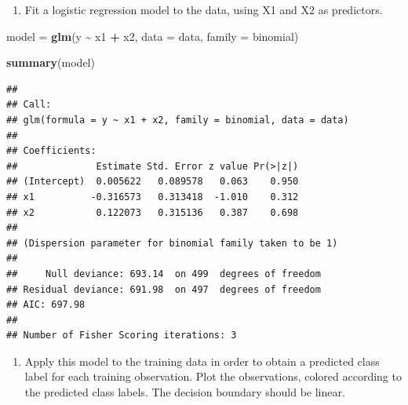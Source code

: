 \documentclass[
]{article}
\newenvironment{Shaded}{\begin{snugshade}}{\end{snugshade}}
\newcommand{\AttributeTok}[1]{\textcolor[rgb]{0.13,0.29,0.53}{#1}}
\newcommand{\FunctionTok}[1]{\textcolor[rgb]{0.13,0.29,0.53}{\textbf{#1}}}
\newcommand{\NormalTok}[1]{#1}
\newcommand{\OtherTok}[1]{\textcolor[rgb]{0.56,0.35,0.01}{#1}}
\newcommand{\SpecialCharTok}[1]{\textcolor[rgb]{0.81,0.36,0.00}{\textbf{#1}}}
\providecommand{\tightlist}{%
  \setlength{\itemsep}{0pt}\setlength{\parskip}{0pt}}
\begin{document}
\begin{enumerate}
\def\labelenumi{(\alph{enumi})}
\setcounter{enumi}{2}
\tightlist
\item
  Fit a logistic regression model to the data, using X1 and X2 as
  predictors.
\end{enumerate}

\begin{Shaded}
\begin{Highlighting}[]
\NormalTok{model }\OtherTok{=} \FunctionTok{glm}\NormalTok{(y }\SpecialCharTok{\textasciitilde{}}\NormalTok{ x1 }\SpecialCharTok{+}\NormalTok{ x2, }\AttributeTok{data =}\NormalTok{ data, }\AttributeTok{family =}\NormalTok{ binomial)}

\FunctionTok{summary}\NormalTok{(model)}
\end{Highlighting}
\end{Shaded}

\begin{verbatim}
## 
## Call:
## glm(formula = y ~ x1 + x2, family = binomial, data = data)
## 
## Coefficients:
##              Estimate Std. Error z value Pr(>|z|)
## (Intercept)  0.005622   0.089578   0.063    0.950
## x1          -0.316573   0.313418  -1.010    0.312
## x2           0.122073   0.315136   0.387    0.698
## 
## (Dispersion parameter for binomial family taken to be 1)
## 
##     Null deviance: 693.14  on 499  degrees of freedom
## Residual deviance: 691.98  on 497  degrees of freedom
## AIC: 697.98
## 
## Number of Fisher Scoring iterations: 3
\end{verbatim}

\begin{enumerate}
\def\labelenumi{(\alph{enumi})}
\setcounter{enumi}{3}
\tightlist
\item
  Apply this model to the training data in order to obtain a predicted
  class label for each training observation. Plot the observations,
  colored according to the predicted class labels. The decision boundary
  should be linear.
\end{enumerate}
\end{document}
